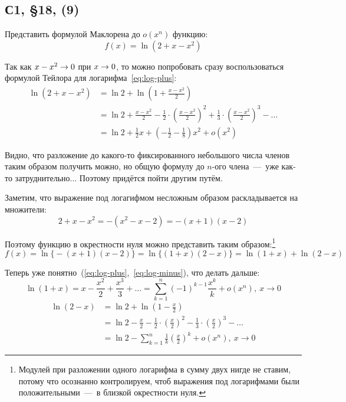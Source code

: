 \documentclass[a4paper,12pt]{article}
\begin{document}
  
  
  
  \subsection{С1, \S 18, (9)}
  \label{n:1-18-2(9)}
  
  Представить формулой Маклорена до $o(x^n)$ функцию:
  \[
    f(x) = \ln{(2 + x - x^2)}
  \]
  
  \begin{solution}
    Так как $x \hm- x^2 \hm\to 0$ при $x \hm\to 0$, то можно попробовать сразу воспользоваться формулой Тейлора для логарифма~\eqref{eq:log-plus}:
    \begin{equation*}
    \begin{split}
      \ln{(2 + x - x^2)} &= \ln 2 + \ln\left(1 + \frac{x - x^2}{2}\right)\\
        &= \ln 2 + \frac{x - x^2}{2} - \frac{1}{2} \cdot \left(\frac{x - x^2}{2}\right)^2 + \frac{1}{3} \cdot \left(\frac{x - x^2}{2}\right)^3 - \ldots\\
        &= \ln 2 + \frac{1}{2} x + \left(-\frac{1}{2} - \frac{1}{8}\right) x^2 + o(x^2)
    \end{split}
    \end{equation*}
    
    Видно, что разложение до какого-то фиксированного небольшого числа членов таким образом получить можно, но общую формулу до $n$-ого члена~---~уже как-то затруднительно...
    Поэтому придётся пойти другим путём.
    
    Заметим, что выражение под логагифмом несложным образом раскладывается на множители:
    \[
      2 + x - x^2 = -(x^2 - x - 2) = -(x + 1)(x - 2)
    \]
    
    Поэтому функцию в окрестности нуля можно представить таким образом:\footnote{
      Модулей при разложении одного логарифма в сумму двух нигде не ставим, потому что осознанно контролируем, чтоб выражения под логарифмами были положительными~---~в близкой окрестности нуля.
    }
    \[
      f(x) = \ln{\bigl\{-(x + 1)(x - 2)\bigr\}} = \ln{\bigl\{(1 + x)(2 - x)\bigr\}} = \ln{(1 + x)} + \ln{(2 - x)}
    \]
    
    Теперь уже понятно~(\ref{eq:log-plus},~\ref{eq:log-minus}), что делать дальше:
    \[
      \ln{(1 + x)} = x - \frac{x^2}{2} + \frac{x^3}{3} + \ldots = \sum_{k = 1}^n (-1)^{k - 1} \frac{x^k}{k} + o(x^n),\ x \to 0
    \]
    \begin{equation*}
    \begin{split}
      \ln{(2 - x)} &= \ln 2 + \ln\left(1 - \frac{x}{2}\right)\\
      &= \ln 2 - \frac{x}{2} - \frac{1}{2} \cdot \left(\frac{x}{2}\right)^2 - \frac{1}{3} \cdot \left(\frac{x}{2}\right)^3 - \ldots\\
      &= \ln 2 - \sum_{k = 1}^n \frac{1}{k} \left(\frac{x}{2}\right)^k + o(x^n),\ x \to 0
    \end{split}
    \end{equation*}
    

\end{solution}
\end{document}
